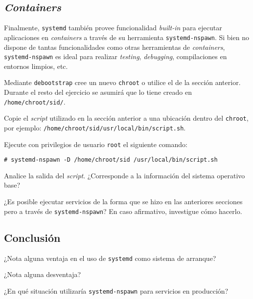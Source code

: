\subsection{\textit{Containers}}
Finalmente, \texttt{systemd} también provee funcionalidad \textit{built-in}
para ejecutar aplicaciones en \textit{containers} a través de su
herramienta \texttt{systemd-nspawn}. Si bien no dispone de tantas
funcionalidades como otras herramientas de \textit{containers},
\texttt{systemd-nspawn} es ideal para realizar \textit{testing},
\textit{debugging}, compilaciones en entornos limpios, etc.
\begin{questions}
  \question Mediante \texttt{debootstrap} cree un nuevo \texttt{chroot} o
  utilice el de la sección anterior. Durante el resto del ejercicio se
  asumirá que lo tiene creado en \texttt{/home/chroot/sid/}.

  \question Copie el \textit{script} utilizado en la sección anterior a una
  ubicación dentro del \texttt{chroot}, por ejemplo:
  \texttt{/home/chroot/sid/usr/local/bin/script.sh}.

  \question Ejecute con privilegios de usuario \texttt{root} el siguiente
  comando:
\begin{verbatim}
# systemd-nspawn -D /home/chroot/sid /usr/local/bin/script.sh
\end{verbatim}

  \question Analice la salida del \textit{script}. ¿Corresponde a la
  información del sistema operativo base?

  \question ¿Es posible ejecutar servicios de la forma que se hizo en las
  anteriores secciones pero a través de \texttt{systemd-nspawn}? En caso
  afirmativo, investigue cómo hacerlo.

\end{questions}

\subsection{Conclusión}
\begin{questions}
  \question ¿Nota alguna ventaja en el uso de \texttt{systemd} como sistema
  de arranque?

  \question ¿Nota alguna desventaja?

  \question ¿En qué situación utilizaría \texttt{systemd-nspawn} para
  servicios en producción?
\end{questions}